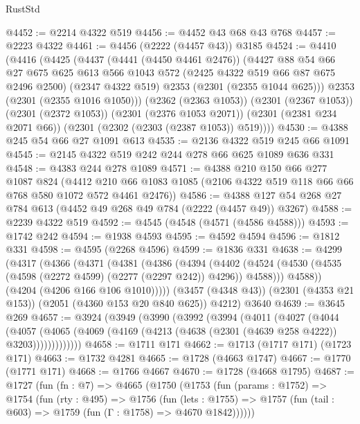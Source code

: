 \begin{lexlean}{RustStd}
\begin{coremodule}
{\begin{coremodule}
{{{{{{{{{{{{{@4452 := @2214 @4322 @519
@4456 := @4452 @43 @68 @43 @768
@4457 := @2223 @4322
@4461 := @4456 (@2222 (@4457 @43)) @3185
@4524 := @4410
    (@4416
      (@4425
        (@4437
          (@4441 (@4450 @4461 @2476))
          (@4427
            @88
            @54
            @66
            @27
            @675
            @625
            @613
            @566
            @1043
            @572
            (@2425 @4322 @519 @66 @87 @675 @2496 @2500)
            (@2347 @4322 @519)
            @2353
            (@2301 (@2355 @1044 @625)))
          @2353
          (@2301 (@2355 @1016 @1050)))
        (@2362 (@2363 @1053))
        (@2301 (@2367 @1053))
        (@2301 (@2372 @1053))
        (@2301 (@2376 @1053 @2071))
        (@2301 (@2381 @234 @2071 @66))
        (@2301 (@2302 (@2303 (@2387 @1053)) @519))))
@4530 := @4388 @245 @54 @66 @27 @1091 @613
@4535 := @2136 @4322 @519 @245 @66 @1091
@4545 := @2145 @4322 @519 @242 @244 @278 @66 @625 @1089 @636 @331
@4548 := @4383 @244 @278 @1089
@4571 := @4388
    @210
    @150
    @66
    @277
    @1087
    @824
    (@4412 @210 @66 @1083 @1085 (@2106 @4322 @519 @118 @66 @66 @768 @580 @1072 @572 @4461 @2476))
@4586 := @4388 @127 @54 @268 @27 @784 @613 (@4452 @49 @268 @49 @784 (@2222 (@4457 @49)) @3267)
@4588 := @2239 @4322 @519
@4592 := @4545 (@4548 (@4571 (@4586 @4588)))
@4593 := @1742 @242
@4594 := @1938 @4593
@4595 := @4592 @4594
@4596 := @1812 @331
@4598 := @4595 (@2268 @4596)
@4599 := @1836 @331
@4638 := @4299
    (@4317
      (@4366
        (@4371
          (@4381
            (@4386
              (@4394
                (@4402
                  (@4524 (@4530 (@4535 (@4598 (@2272 @4599) (@2277 (@2297 @242)) @4296)) @4588)))
                @4588))
            (@4204 (@4206 @166 @106 @1010)))))
      (@3457 (@4348 @43))
      (@2301 (@4353 @21 @153))
      (@2051 (@4360 @153 @20 @840 @625))
      @4212)
    @3640
@4639 := @3645 @269
@4657 := @3924
    (@3949
      (@3990
        (@3992
          (@3994
            (@4011
              (@4027
                (@4044
                  (@4057
                    (@4065 (@4069 (@4169 (@4213 (@4638 (@2301 (@4639 @258 @4222)) @3203)))))))))))))
@4658 := @1711 @171
@4662 := @1713 (@1717 @171) (@1723 @171)
@4663 := @1732 @4281
@4665 := @1728 (@4663 @1747)
@4667 := @1770 (@1771 @171)
@4668 := @1766 @4667
@4670 := @1728 (@4668 @1795)
@4687 := @1727
    (fun (fn : @7) =>
    @4665
      (@1750
        (@1753
          (fun (params : @1752) =>
          @1754
            (fun (rty : @495) =>
            @1756
              (fun (lets : @1755) =>
              @1757 (fun (tail : @603) => @1759 (fun (Γ : @1758) => @4670 @1842))))))
}}}}}}}}}}}}}
\end{coremodule}}
\end{coremodule}
\end{lexlean}
